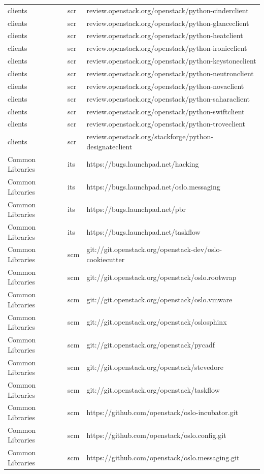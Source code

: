 \documentclass[a4wide,11pt]{report}
\begin{document}
\begin{center}
\begin{longtable}{|p{4cm}|p{1cm}|p{10cm}|}
clients&scr&review.openstack.org/openstack/python-cinderclient\\ 
clients&scr&review.openstack.org/openstack/python-glanceclient\\ 
clients&scr&review.openstack.org/openstack/python-heatclient\\ 
clients&scr&review.openstack.org/openstack/python-ironicclient\\ 
clients&scr&review.openstack.org/openstack/python-keystoneclient\\ 
clients&scr&review.openstack.org/openstack/python-neutronclient\\ 
clients&scr&review.openstack.org/openstack/python-novaclient\\ 
clients&scr&review.openstack.org/openstack/python-saharaclient\\ 
clients&scr&review.openstack.org/openstack/python-swiftclient\\ 
clients&scr&review.openstack.org/openstack/python-troveclient\\ 
clients&scr&review.openstack.org/stackforge/python-designateclient\\ 
Common Libraries&its&https://bugs.launchpad.net/hacking\\ 
Common Libraries&its&https://bugs.launchpad.net/oslo.messaging\\ 
Common Libraries&its&https://bugs.launchpad.net/pbr\\ 
Common Libraries&its&https://bugs.launchpad.net/taskflow\\ 
Common Libraries&scm&git://git.openstack.org/openstack-dev/oslo-cookiecutter\\ 
Common Libraries&scm&git://git.openstack.org/openstack/oslo.rootwrap\\ 
Common Libraries&scm&git://git.openstack.org/openstack/oslo.vmware\\ 
Common Libraries&scm&git://git.openstack.org/openstack/oslosphinx\\ 
Common Libraries&scm&git://git.openstack.org/openstack/pycadf\\ 
Common Libraries&scm&git://git.openstack.org/openstack/stevedore\\ 
Common Libraries&scm&git://git.openstack.org/openstack/taskflow\\ 
Common Libraries&scm&https://github.com/openstack/oslo-incubator.git\\ 
Common Libraries&scm&https://github.com/openstack/oslo.config.git\\ 
Common Libraries&scm&https://github.com/openstack/oslo.messaging.git\\ 

\end{longtable}
\end{center}
\end{document}

